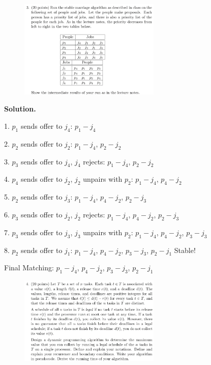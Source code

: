 \documentclass[10pt]{article}
\begin{document}
\newpage

\begin{figure}[h]
	\centering
	\includegraphics[width=0.6\textwidth]{hw3-3}
\end{figure}

\textbf{Solution.}

1. $p_1$ sends offer to $j_4$: $p_1-j_4$

2. $p_2$ sends offer to $j_2$: $p_1-j_4$, $p_2-j_2$

3. $p_3$ sends offer to $j_4$, $j_4$ rejects: $p_1-j_4$, $p_2-j_2$

4. $p_4$ sends offer to $j_2$, $j_2$ unpairs with $p_2$: $p_1-j_4$, $p_4-j_2$

5. $p_2$ sends offer to $j_3$: $p_1-j_4$, $p_4-j_2$, $p_2-j_3$

6. $p_3$ sends offer to $j_2$, $j_2$ rejects: $p_1-j_4$, $p_4-j_2$, $p_2-j_3$

7. $p_3$ sends offer to $j_3$, $j_3$ unpairs with $p_2$: $p_1-j_4$, $p_4-j_2$, $p_3-j_3$

8. $p_2$ sends offer to $j_1$: $p_1-j_4$, $p_4-j_2$, $p_3-j_3$, $p_2-j_1$ Stable!

Final Matching: $p_1-j_4$, $p_4-j_2$, $p_3-j_3$, $p_2-j_1$

\newpage

\begin{figure}[h]
	\centering
	\includegraphics[width=0.6\textwidth]{hw3-4}
\end{figure}
\end{document}
